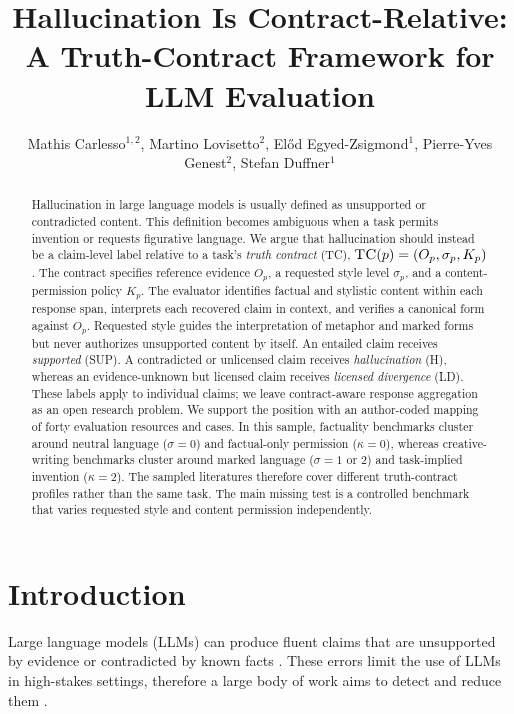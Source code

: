 \documentclass{clv2025}
\title{Hallucination Is Contract-Relative: A Truth-Contract Framework for LLM Evaluation}
\author{Mathis Carlesso$^{1,2}$, Martino Lovisetto$^{2}$, El\H{o}d Egyed-Zsigmond$^{1}$, Pierre-Yves Genest$^{2}$, Stefan Duffner$^{1}$}
\affil{INSA Lyon, CNRS, LIRIS, UMR5205, Universit\'e Claude Bernard Lyon 1, 69621 Villeurbanne, France\\
  \quad \email{mathis.carlesso@insa-lyon.fr}}
\affil{Alteca, 69100 Villeurbanne, France}
\newcommand{\TC}{\textsc{TC}}
\newcommand{\LD}{\textsc{LD}}
\newcommand{\Hall}{\textsc{H}}
\newcommand{\SUP}{\textsc{SUP}}
\begin{document}
\maketitle

\begin{abstract}
Hallucination in large language models is usually defined as unsupported or contradicted content.
This definition becomes ambiguous when a task permits invention or requests figurative language.
We argue that hallucination should instead be a claim-level label relative to a task's \emph{truth contract} (TC), $\TC(p)=(O_p,\sigma_p,K_p)$.
The contract specifies reference evidence $O_p$, a requested style level $\sigma_p$, and a content-permission policy $K_p$.
The evaluator identifies factual and stylistic content within each response span, interprets each recovered claim in context, and verifies a canonical form against $O_p$.
Requested style guides the interpretation of metaphor and marked forms but never authorizes unsupported content by itself.
An entailed claim receives \emph{supported} (\SUP).
A contradicted or unlicensed claim receives \emph{hallucination} (\Hall), whereas an evidence-unknown but licensed claim receives \emph{licensed divergence} (\LD).
These labels apply to individual claims; we leave contract-aware response aggregation as an open research problem.
We support the position with an author-coded mapping of forty evaluation resources and cases.
In this sample, factuality benchmarks cluster around neutral language ($\sigma=0$) and factual-only permission ($\kappa=0$), whereas creative-writing benchmarks cluster around marked language ($\sigma=1$ or $2$) and task-implied invention ($\kappa=2$).
The sampled literatures therefore cover different truth-contract profiles rather than the same task.
The main missing test is a controlled benchmark that varies requested style and content permission independently.

\end{abstract}

\section{Introduction}\label{sec:intro}

Large language models (LLMs) can produce fluent claims that are unsupported by evidence or contradicted by known facts \citep{ji_survey_2023,huang_survey_2025}.
These errors limit the use of LLMs in high-stakes settings, therefore a large body of work aims to detect and reduce them \citep{lin_truthfulqa_2022,li_halueval_2023,wei_measuring_2024}.
\end{document}
